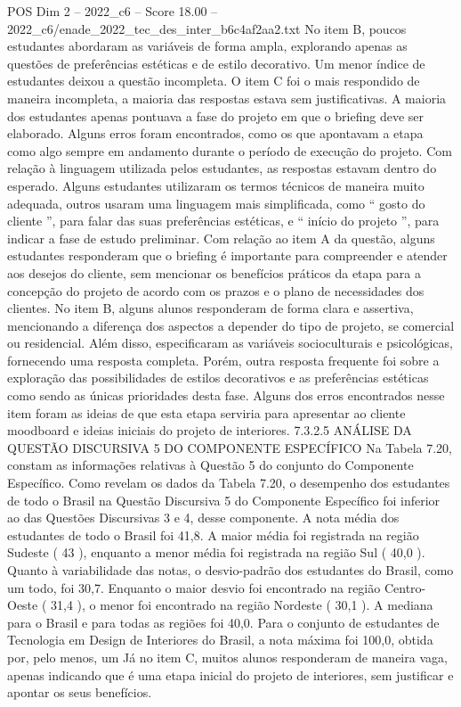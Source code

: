 \begin{textsample}{POS Dim 2 – 2022\_c6 – Score 18.00 – 2022\_c6/enade\_2022\_tec\_des\_inter\_b6c4af2aa2.txt}
No item B, poucos estudantes abordaram as variáveis de forma ampla, explorando apenas as questões de preferências estéticas e de estilo decorativo.
Um menor índice de estudantes deixou a questão incompleta.
O item C foi o mais respondido de maneira incompleta, a maioria das respostas estava sem justificativas.
A maioria dos estudantes apenas pontuava a fase do projeto em que o briefing deve ser elaborado.
Alguns erros foram encontrados, como os que apontavam a etapa como algo sempre em andamento durante o período de execução do projeto.
Com relação à linguagem utilizada pelos estudantes, as respostas estavam dentro do esperado.
Alguns estudantes utilizaram os termos técnicos de maneira muito adequada, outros usaram uma linguagem mais simplificada, como “ gosto do cliente ”, para falar das suas preferências estéticas, e “ início do projeto ”, para indicar a fase de estudo preliminar.
Com relação ao item A da questão, alguns estudantes responderam que o briefing é importante para compreender e atender aos desejos do cliente, sem mencionar os benefícios práticos da etapa para a concepção do projeto de acordo com os prazos e o plano de necessidades dos clientes.
No item B, alguns alunos responderam de forma clara e assertiva, mencionando a diferença dos aspectos a depender do tipo de projeto, se comercial ou residencial.
Além disso, especificaram as variáveis socioculturais e psicológicas, fornecendo uma resposta completa.
Porém, outra resposta frequente foi sobre a exploração das possibilidades de estilos decorativos e as preferências estéticas como sendo as únicas prioridades desta fase.
Alguns dos erros encontrados nesse item foram as ideias de que esta etapa serviria para apresentar ao cliente moodboard e ideias iniciais do projeto de interiores. 7.3.2.5 ANÁLISE DA QUESTÃO DISCURSIVA 5 DO COMPONENTE ESPECÍFICO Na Tabela 7.20, constam as informações relativas à Questão 5 do conjunto do Componente Específico.
Como revelam os dados da Tabela 7.20, o desempenho dos estudantes de todo o Brasil na Questão Discursiva 5 do Componente Específico foi inferior ao das Questões Discursivas 3 e 4, desse componente.
A nota média dos estudantes de todo o Brasil foi 41,8.
A maior média foi registrada na região Sudeste ( 43 ), enquanto a menor média foi registrada na região Sul ( 40,0 ).
Quanto à variabilidade das notas, o desvio-padrão dos estudantes do Brasil, como um todo, foi 30,7.
Enquanto o maior desvio foi encontrado na região Centro-Oeste ( 31,4 ), o menor foi encontrado na região Nordeste ( 30,1 ).
A mediana para o Brasil e para todas as regiões foi 40,0.
Para o conjunto de estudantes de Tecnologia em Design de Interiores do Brasil, a nota máxima foi 100,0, obtida por, pelo menos, um Já no item C, muitos alunos responderam de maneira vaga, apenas indicando que é uma etapa inicial do projeto de interiores, sem justificar e apontar os seus benefícios.

\end{textsample}
